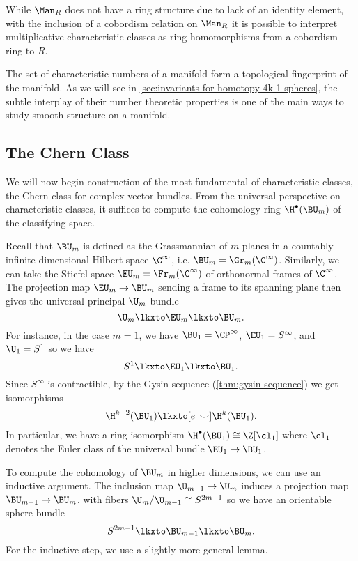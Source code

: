 \begin{remark}
	While $\Man_R$ does not have a ring structure due to lack of an identity element, with the inclusion of a cobordism relation on $\Man_R$ it is possible to interpret multiplicative characteristic classes as ring homomorphisms from a cobordism ring to $R$.
\end{remark}

The set of characteristic numbers of a manifold form a topological fingerprint of the manifold. As we will see in \cref{sec:invariants-for-homotopy-4k-1-spheres}, the subtle interplay of their number theoretic properties is one of the main ways to study smooth structure on a manifold.

\subsection{The Chern Class}\label{sec:chern-class}

We will now begin construction of the most fundamental of characteristic classes, the Chern class for complex vector bundles. From the universal perspective on characteristic classes, it suffices to compute the cohomology ring $\H^\bullet(\BU_m)$ of the classifying space. 

Recall that $\BU_m$ is defined as the Grassmannian of $m$-planes in a countably infinite-dimensional Hilbert space $\C^\infty$, i.e. $\BU_m=\Gr_m(\C^\infty)$. Similarly, we can take the Stiefel space $\EU_m=\Fr_m(\C^\infty)$ of orthonormal frames of $\C^\infty$. The projection map $\EU_m \to \BU_m$ sending a frame to its spanning plane then gives the universal principal $\U_m$-bundle
\[
		\U_m \lkxto \EU_m \lkxto \BU_m.
\]
For instance, in the case $m=1$, we have $\BU_1=\CP^\infty$, $\EU_1=S^\infty$, and $\U_1=S^1$ so we have
\[
		S^1\lkxto \EU_1 \lkxto \BU_1.
\]
Since $S^\infty$ is contractible, by the Gysin sequence (\cref{thm:gysin-sequence}) we get isomorphisms
\[
	\H^{k-2}(\BU_1)\lkxto[e\,\smile] \H^k(\BU_1).
\]
In particular, we have a ring isomorphism $\H^\bullet(\BU_1)\cong \Z[\cl_1]$ where $\cl_1$ denotes the Euler class of the universal bundle $\EU_1 \to \BU_1$. 

To compute the cohomology of $\BU_m$ in higher dimensions, we can use an inductive argument. The inclusion map $\U_{m-1} \to \U_m$ induces a projection map $\BU_{m-1} \to \BU_{m}$, with fibers $\U_{m}/\U_{m-1}\cong S^{2m-1}$ so we have an orientable sphere bundle
\[
	S^{2m-1} \lkxto \BU_{m-1} \lkxto \BU_{m}.
\]
For the inductive step, we use a slightly more general lemma.

